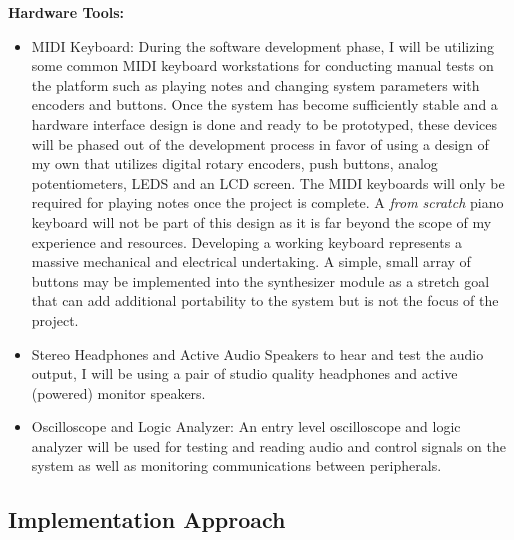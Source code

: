 \documentclass[12pt]{article}
\begin{document}
\textbf{Hardware Tools:}
\begin{itemize}
    \item MIDI Keyboard: During the software development phase, I will be utilizing some common MIDI keyboard workstations for conducting manual tests on the platform such as playing notes and changing system parameters with encoders and buttons. Once the system has become sufficiently stable and a hardware interface design is done and ready to be prototyped, these devices will be phased out of the development process in favor of using a design of my own that utilizes digital rotary encoders, push buttons, analog potentiometers, LEDS and an LCD screen. The MIDI keyboards will only be required for playing notes once the project is complete. A \textit{from scratch} piano keyboard will not be part of this design as it is far beyond the scope of my experience and resources. Developing a working keyboard represents a massive mechanical and electrical undertaking. A simple, small array of buttons may be implemented into the synthesizer module as a stretch goal that can add additional portability to the system but is not the focus of the project. \cite{lacamera_2020}
    \item Stereo Headphones and Active Audio Speakers to hear and test the audio output, I will be using a pair of studio quality headphones and active (powered) monitor speakers.
    \item Oscilloscope and Logic Analyzer: An entry level oscilloscope and logic analyzer will be used for testing and reading audio and control signals on the system as well as monitoring communications between peripherals. \cite{lacamera_2020}
\end{itemize}

\subsection{Implementation Approach}
\end{document}
